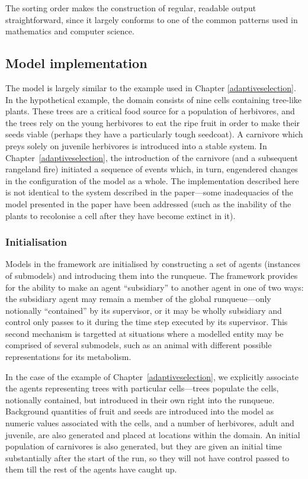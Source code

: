 The sorting order makes the construction of regular, readable output
straightforward, since it largely conforms to one of the common
patterns used in mathematics and computer science. 

\subsection{Model implementation}

The model is largely similar to the example used in Chapter
\ref{adaptiveselection}. In the hypothetical example, the domain
consists of nine cells containing tree-like plants. These trees are a
critical food source for a population of herbivores, and the trees
rely on the young herbivores to eat the ripe fruit in order to make
their seeds viable (perhaps they have a particularly tough
seedcoat). A carnivore which preys solely on juvenile herbivores is
introduced into a stable system.  In Chapter~\ref{adaptiveselection},
the introduction of the carnivore (and a subsequent rangeland fire)
initiated a sequence of events which, in turn, engendered
changes in the configuration of the model as a whole.  The
implementation described here is not identical to the system described
in the paper---some inadequacies of the model presented in the paper
have been addressed (such as the inability of the plants to recolonise
a cell after they have become extinct in it).

\subsubsection{Initialisation}

Models in the framework are initialised by constructing a set of
agents (instances of submodels) and introducing them into the
runqueue. The framework provides for the ability to make an agent
``subsidiary'' to another agent in one of two ways: the subsidiary
agent may remain a member of the global runqueue---only notionally
``contained'' by its supervisor, or it may be wholly subsidiary and
control only passes to it during the time step executed by its
supervisor. This second mechanism is targetted at situations where a
modelled entity may be comprised of several submodels, such as an
animal with different possible representations for its metabolism. 

In the case of the example of Chapter~\ref{adaptiveselection}, we
explicitly associate the agents representing trees with particular
cells---trees populate the cells, notionally contained, but
introduced in their own right into the runqueue.  Background
quantities of fruit and seeds are introduced into the model as numeric
values associated with the cells, and a number of herbivores, adult
and juvenile, are also generated and placed at locations within the
domain. An initial population of carnivores is also generated, but
they are given an initial time substantially after the start of the
run, so they will not have control passed to them till the rest of the
agents have caught up.

